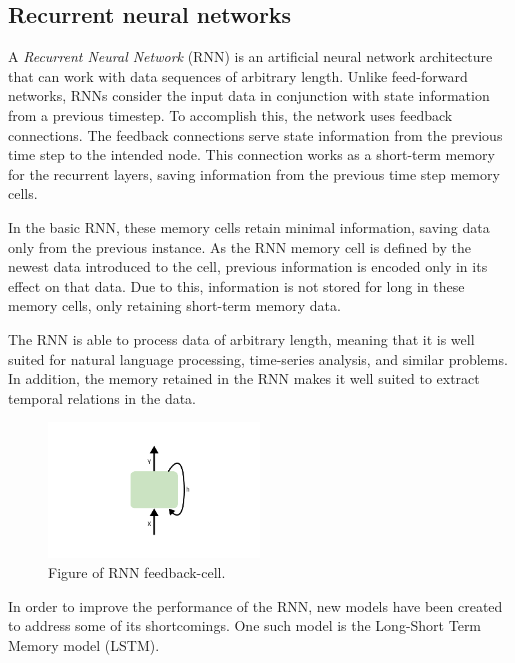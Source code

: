 \subsection{Recurrent neural networks}
\label{section:BT:RNN}

A \textit{Recurrent Neural Network} (RNN) is an artificial neural network architecture that can work with data sequences of arbitrary length.
Unlike feed-forward networks, RNNs consider the input data in conjunction with state information from a previous timestep.
To accomplish this, the network uses feedback connections.
The feedback connections serve state information from the previous time step to the intended node.
This connection works as a short-term memory for the recurrent layers, saving information from the previous time step memory cells.

In the basic RNN, these memory cells retain minimal information, saving data only from the previous instance.
As the RNN memory cell is defined by the newest data introduced to the cell, previous information is encoded only in its effect on that data.
Due to this, information is not stored for long in these memory cells, only retaining short-term memory data.

The RNN is able to process data of arbitrary length, meaning that it is well suited for natural language processing, time-series analysis, and similar problems.
In addition, the memory retained in the RNN makes it well suited to extract temporal relations in the data.

\begin{figure}[h!]
  \centering
  \includegraphics[width=0.5\textwidth]{./sections/BT/figures/RNN.png}
  \hfill
  \caption{Figure of RNN feedback-cell.}
  \label{fig:rnn-cell}
\end{figure}



In order to improve the performance of the RNN, new models have been created to address some of its shortcomings.
One such model is the Long-Short Term Memory model (LSTM).


\cite[p.~469-472]{Geron2017}



